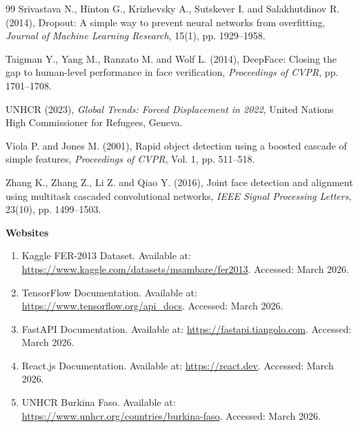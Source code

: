 \documentclass[a4paper,12pt,oneside]{report}
\begin{document}
\begin{thebibliography}{99}
Srivastava N., Hinton G., Krizhevsky A., Sutskever I. and Salakhutdinov R. (2014),
Dropout: A simple way to prevent neural networks from overfitting,
\textit{Journal of Machine Learning Research}, 15(1), pp. 1929--1958.

Taigman Y., Yang M., Ranzato M. and Wolf L. (2014),
DeepFace: Closing the gap to human-level performance in face verification,
\textit{Proceedings of CVPR}, pp. 1701--1708.

UNHCR (2023),
\textit{Global Trends: Forced Displacement in 2022},
United Nations High Commissioner for Refugees, Geneva.

Viola P. and Jones M. (2001),
Rapid object detection using a boosted cascade of simple features,
\textit{Proceedings of CVPR}, Vol. 1, pp. 511--518.

Zhang K., Zhang Z., Li Z. and Qiao Y. (2016),
Joint face detection and alignment using multitask cascaded convolutional networks,
\textit{IEEE Signal Processing Letters}, 23(10), pp. 1499--1503.

\end{thebibliography}

\vspace{1cm}
\noindent\textbf{Websites}
\begin{enumerate}
    \item Kaggle FER-2013 Dataset. Available at:
    \url{https://www.kaggle.com/datasets/msambare/fer2013}. Accessed: March 2026.
    \item TensorFlow Documentation. Available at:
    \url{https://www.tensorflow.org/api_docs}. Accessed: March 2026.
    \item FastAPI Documentation. Available at:
    \url{https://fastapi.tiangolo.com}. Accessed: March 2026.
    \item React.js Documentation. Available at:
    \url{https://react.dev}. Accessed: March 2026.
    \item UNHCR Burkina Faso. Available at:
    \url{https://www.unhcr.org/countries/burkina-faso}. Accessed: March 2026.
\end{enumerate}

\clearpage
\end{document}
